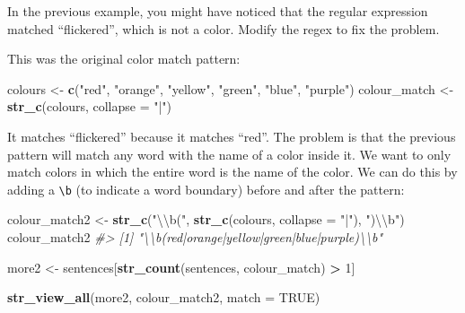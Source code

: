 \documentclass[]{book}
\newenvironment{Shaded}{\begin{snugshade}}{\end{snugshade}}
\newcommand{\CharTok}[1]{\textcolor[rgb]{0.31,0.60,0.02}{#1}}
\newcommand{\CommentTok}[1]{\textcolor[rgb]{0.56,0.35,0.01}{\textit{#1}}}
\newcommand{\DataTypeTok}[1]{\textcolor[rgb]{0.13,0.29,0.53}{#1}}
\newcommand{\DecValTok}[1]{\textcolor[rgb]{0.00,0.00,0.81}{#1}}
\newcommand{\KeywordTok}[1]{\textcolor[rgb]{0.13,0.29,0.53}{\textbf{#1}}}
\newcommand{\NormalTok}[1]{#1}
\newcommand{\OperatorTok}[1]{\textcolor[rgb]{0.81,0.36,0.00}{\textbf{#1}}}
\newcommand{\OtherTok}[1]{\textcolor[rgb]{0.56,0.35,0.01}{#1}}
\newcommand{\StringTok}[1]{\textcolor[rgb]{0.31,0.60,0.02}{#1}}
\theoremstyle{plain}
\theoremstyle{remark}
\begin{document}
In the previous example, you might have noticed that the regular expression matched ``flickered'', which is not a color. Modify the regex to fix the problem.

This was the original color match pattern:

\begin{Shaded}
\begin{Highlighting}[]
\NormalTok{colours <-}\StringTok{ }\KeywordTok{c}\NormalTok{(}\StringTok{"red"}\NormalTok{, }\StringTok{"orange"}\NormalTok{, }\StringTok{"yellow"}\NormalTok{, }\StringTok{"green"}\NormalTok{, }\StringTok{"blue"}\NormalTok{, }\StringTok{"purple"}\NormalTok{)}
\NormalTok{colour_match <-}\StringTok{ }\KeywordTok{str_c}\NormalTok{(colours, }\DataTypeTok{collapse =} \StringTok{"|"}\NormalTok{)}
\end{Highlighting}
\end{Shaded}

It matches ``flickered'' because it matches ``red''.
The problem is that the previous pattern will match any word with the name of a color inside it. We want to only match colors in which the entire word is the name of the color.
We can do this by adding a \texttt{\textbackslash{}b} (to indicate a word boundary) before and after the pattern:

\begin{Shaded}
\begin{Highlighting}[]
\NormalTok{colour_match2 <-}\StringTok{ }\KeywordTok{str_c}\NormalTok{(}\StringTok{"}\CharTok{\textbackslash{}\textbackslash{}}\StringTok{b("}\NormalTok{, }\KeywordTok{str_c}\NormalTok{(colours, }\DataTypeTok{collapse =} \StringTok{"|"}\NormalTok{), }\StringTok{")}\CharTok{\textbackslash{}\textbackslash{}}\StringTok{b"}\NormalTok{)}
\NormalTok{colour_match2}
\CommentTok{#> [1] "\textbackslash{}\textbackslash{}b(red|orange|yellow|green|blue|purple)\textbackslash{}\textbackslash{}b"}
\end{Highlighting}
\end{Shaded}

\begin{Shaded}
\begin{Highlighting}[]
\NormalTok{more2 <-}\StringTok{ }\NormalTok{sentences[}\KeywordTok{str_count}\NormalTok{(sentences, colour_match) }\OperatorTok{>}\StringTok{ }\DecValTok{1}\NormalTok{]}
\end{Highlighting}
\end{Shaded}

\begin{Shaded}
\begin{Highlighting}[]
\KeywordTok{str_view_all}\NormalTok{(more2, colour_match2, }\DataTypeTok{match =} \OtherTok{TRUE}\NormalTok{)}
\end{Highlighting}
\end{Shaded}
\end{document}
